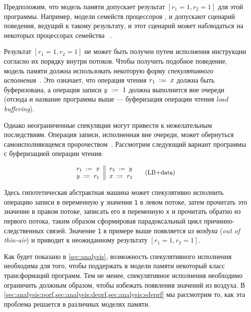 Предположим, что модель памяти допускает 
результат ${[r_1=1, r_2=1]}$ для этой программы. 
Например, модели семейств процессоров 
,  и \POWER
допускают  сценарий поведения, ведущий к такому результату, 
и этот сценарий может наблюдаться на некоторых процессорах семейства 
~\cite{Maranget-al:Tutorial2012}.

Результат ${[r_1=1, r_2=1]}$ не может быть получен 
путем исполнения инструкции согласно их порядку внутри потоков.
Чтобы получить подобное поведение, 
модель памяти должна  использовать 
некоторую форму \emph{спекулятивного исполнения}~\cite{Boudol-Petri:ESOP10, Boehm-Demsky:MSPC14}.
Это означает, что  операция чтения $r_1\;:=_{}\;x$
должна быть буферизована, а операция записи $y\;:=_{}\;1$ 
должна выполнится вне очереди 
(отсюда и название программы выше --- 
буферизация операции чтения \emph{load buffering}).

Однако неограниченные спекуляции могут привести 
к нежелательным последствиям. 
Операция записи, исполненная вне очереди, может обернуться
самоисполняющемся пророчеством~\cite{Boehm-Demsky:MSPC14}. 
Рассмотрим следующий вариант программы с буферизацией операции чтения:

\begin{equation*}
\small
\inarrII{
  \readInst{}{r_1}{x}   \\
  \writeInst{}{y}{r_1}  \\
}{
  \readInst{}{r_2}{y}   \\
  \writeInst{}{x}{r_2}  \\
}
\tag{LB+data}\label{ex:lb+data}
\end{equation*}

Здесь гипотетическая абстрактная машина 
может спекулятивно исполнить операцию записи в переменную \texttt{y}
значения \texttt{1} в левом потоке, 
затем прочитать это значение в правом потоке, 
записать его в переменную \texttt{x} и прочитать обратно из 
первого потока, таким образом сформировав парадоксальный цикл 
причинно-следственных связей.  
Значение \texttt{1} в примере выше появляется \emph{из воздуха}
(\emph{out of thin-air}) и приводит 
к неожиданному результату ${[r_1=1, r_2=1]}$.

Как будет показано в \cref{sec:analysis},
возможность спекулятивного исполнения необходима для того, чтобы 
поддержать в модели памяти некоторый класс трансформаций программ. 
Тем не менее, спекулятивное исполнения необходимо 
ограничить должным образом, чтобы избежать 
появления значений из воздуха. 
В \cref{sec:analysis:porf,sec:analysis:deprf,sec:analysis:sdeprf}
мы рассмотрим то, как эта проблема решается в различных моделях памяти. 
